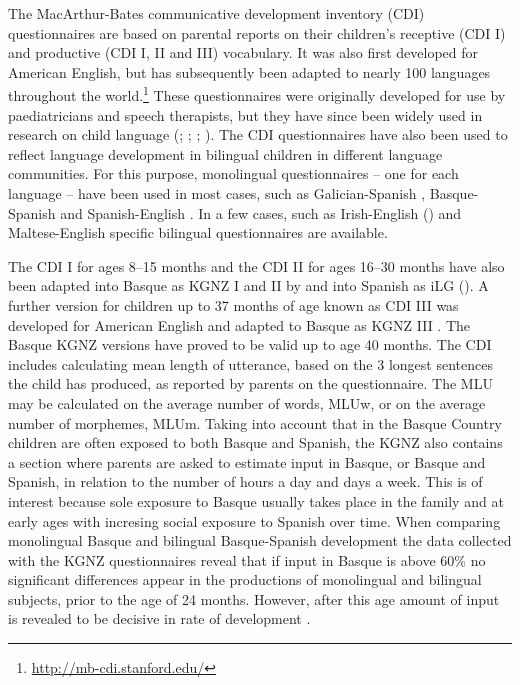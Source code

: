 \documentclass[output=paper]{../langscibook}
\begin{document}
The MacArthur-Bates communicative development inventory (CDI) questionnaires are based on parental reports on their children’s receptive (CDI I) and productive (CDI I, II and III) vocabulary. It was also first developed for American English, but has subsequently been adapted to nearly 100 languages throughout the world.\footnote{\url{http://mb-cdi.stanford.edu/}} These questionnaires were originally developed for use by paediatricians and speech therapists, but they have since been widely used in research on child language (\citealt{FensonEtAl1994}; \citealt{BatesEtAl1995}; \citealt{Kern2007}; \citealt{EricssonEtAl2012}). The CDI questionnaires have also been used to reflect language development in bilingual children in different language communities. For this purpose, monolingual questionnaires -- one for each language -- have been used in most cases, such as Galician-Spanish \citep{Perez-Pereira2008}, Basque-Spanish \citep{EzeizabarrenaEtAl2018} and Spanish-English \citep{CoreEtAl2013}. In a few cases, such as Irish-English (\citealt{OTooleHickey2016}) and Maltese-English \citep{GattEtAl2014} specific bilingual questionnaires are available.

The CDI I for ages 8--15 months and the CDI II for ages 16--30 months have also been adapted into Basque as KGNZ I and II by \citet{BarrenaEtAl2008} and into Spanish as iLG (\citealt{Lopez_OrnatEtAl2003}). A further version for children up to 37 months of age known as CDI III was developed for American English and adapted to Basque as KGNZ III \citep{GarciaEtAl2014}. The Basque KGNZ versions have proved to be valid up to age 40 months. The CDI includes calculating mean length of utterance, based on the 3 longest sentences the child has produced, as reported by parents on the questionnaire. The MLU may be calculated on the average number of words, MLUw, or on the average number of morphemes, MLUm. Taking into account that in the Basque Country children are often exposed to both Basque and Spanish, the KGNZ also contains a section where parents are asked to estimate input in Basque, or Basque and Spanish, in relation to the number of hours a day and days a week. This is of interest because sole exposure to Basque usually takes place in the family and at early ages with incresing social exposure to Spanish over time.  When comparing monolingual Basque and bilingual Basque-Spanish development the data collected with the KGNZ questionnaires reveal that if input in Basque is above 60\% no significant differences appear in the productions of monolingual and bilingual subjects, prior to the age of 24 months. However, after this age amount of input is revealed to be decisive in rate of development \citep{EzeizabarrenaEtAl2013}.
\end{document}
